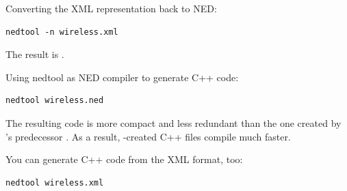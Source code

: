 Converting the XML representation back to NED:

\begin{verbatim}
nedtool -n wireless.xml
\end{verbatim}

The result is .

Using nedtool as NED compiler to generate C++ code:

\begin{verbatim}
nedtool wireless.ned
\end{verbatim}

The resulting code is more compact and less redundant than the
one created by 's predecessor .
As a result, -created 
C++ files compile much faster.

You can generate C++ code from the XML format, too:

\begin{verbatim}
nedtool wireless.xml
\end{verbatim}



